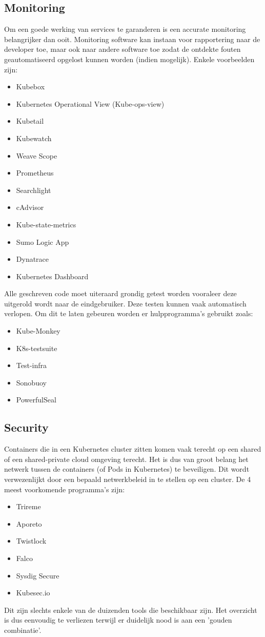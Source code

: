 \subsection{Monitoring}
Om een goede werking van services te garanderen is een accurate monitoring belangrijker dan ooit. Monitoring software kan instaan voor rapportering naar de developer toe, maar ook naar andere software toe zodat de ontdekte fouten geautomatiseerd opgelost kunnen worden (indien mogelijk). Enkele voorbeelden zijn: \autocite{Buehrle2018pt2}
\begin{itemize}
    \item Kubebox
    \item Kubernetes Operational View (Kube-ops-view)
    \item Kubetail
    \item Kubewatch
    \item Weave Scope
    \item Prometheus
    \item Searchlight
    \item cAdvisor
    \item Kube-state-metrics
    \item Sumo Logic App
    \item Dynatrace
    \item Kubernetes Dashboard
\end{itemize}
Alle geschreven code moet uiteraard grondig getest worden vooraleer deze uitgerold wordt naar de eindgebruiker. Deze testen kunnen vaak automatisch verlopen. Om dit te laten gebeuren worden er hulpprogramma's gebruikt zoals:
\begin{itemize}
    \item Kube-Monkey
    \item K8s-testsuite
    \item Test-infra
    \item Sonobuoy
    \item PowerfulSeal
\end{itemize}
\subsection{Security}
Containers die in een Kubernetes cluster zitten komen vaak terecht op een shared of een shared-private cloud omgeving terecht. Het is dus van groot belang het netwerk tussen de containers (of Pods in Kubernetes) te beveiligen. Dit wordt verwezenlijkt door een bepaald netwerkbeleid in te stellen op een cluster. De 4 meest voorkomende programma's zijn:
\begin{itemize}
    \item Trireme
    \item Aporeto
    \item Twistlock
    \item Falco
    \item Sysdig Secure
    \item Kubesec.io
\end{itemize}  
Dit zijn slechts enkele van de duizenden tools die beschikbaar zijn. Het overzicht is dus eenvoudig te verliezen terwijl er duidelijk nood is aan een 'gouden combinatie'.

